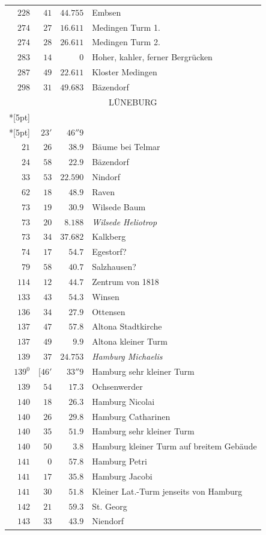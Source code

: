 \begin{longtable}{@{}rrrp{.61\linewidth}@{}}
\(228\)&\(41\)&\(44.755\)&\raggedright Embsen\tabularnewline
\(274\)&\(27\)&\(16.611\)&\raggedright Medingen Turm 1.\tabularnewline
\(274\)&\(28\)&\(26.611\)&\raggedright Medingen Turm 2.\tabularnewline
\(283\)&\(14\)&\(0\)&\raggedright Hoher, kahler, ferner Bergrücken\tabularnewline
\(287\)&\(49\)&\(22.611\)&\raggedright Kloster Medingen\tabularnewline
\(298\)&\(31\)&\(49.683\)&\raggedright Bäzendorf\tabularnewline
\multicolumn{4}{c}{\strut LÜNEBURG}\\*[5pt]
\multicolumn{4}{c}{Hauptplatz \(-191597.163\)\qquad\(-30574.951\)}\\*[5pt]
\multicolumn{3}{r}{\begin{tabular}{@{}rrr|@{}}\(21^{0}\)&\(23'\)&\(46''9\)\\
\(21\)&\(26\)&\(38.9\)\end{tabular}}&\raggedright Bäume bei Telmar\tabularnewline
\(24\)&\(58\)&\(22.9\)&\raggedright Bäzendorf\tabularnewline
\(33\)&\(53\)&\(22.590\)&\raggedright Nindorf\tabularnewline
\(62\)&\(18\)&\(48.9\)&\raggedright Raven\tabularnewline
\(73\)&\(19\)&\(30.9\)&\raggedright Wilsede Baum\tabularnewline
\(73\)&\(20\)&\(8.188\)&\raggedright \textit{Wilsede Heliotrop}\tabularnewline
\(73\)&\(34\)&\(37.682\)&\raggedright Kalkberg\tabularnewline
\(74\)&\(17\)&\(54.7\)&\raggedright Egestorf?\tabularnewline
\(79\)&\(58\)&\(40.7\)&\raggedright Salzhausen?\tabularnewline
\(114\)&\(12\)&\(44.7\)&\raggedright Zentrum von 1818\tabularnewline
\(133\)&\(43\)&\(54.3\)&\raggedright Winsen\tabularnewline
\(136\)&\(34\)&\(27.9\)&\raggedright Ottensen\tabularnewline
\(137\)&\(47\)&\(57.8\)&\raggedright Altona Stadtkirche\tabularnewline
\(137\)&\(49\)&\(9.9\)&\raggedright Altona kleiner Turm\tabularnewline
\(139\)&\(37\)&\(24.753\)&\raggedright \textit{Hamburg Michaelis}\tabularnewline
\(139^{0}\)&\([46'\)&\(33''9\)&\raggedright Hamburg sehr kleiner Turm\tabularnewline
\(139\)&\(54\)&\(17.3\)&\raggedright Ochsenwerder\tabularnewline
\(140\)&\(18\)&\(26.3\)&\raggedright Hamburg Nicolai\tabularnewline
\(140\)&\(26\)&\(29.8\)&\raggedright Hamburg Catharinen\tabularnewline
\(140\)&\(35\)&\(51.9\)&\raggedright Hamburg sehr kleiner Turm\tabularnewline
\(140\)&\(50\)&\(3.8\)&\raggedright Hamburg kleiner Turm auf breitem Gebäude\tabularnewline
\(141\)&\(0\)&\(57.8\)&\raggedright Hamburg Petri\tabularnewline
\(141\)&\(17\)&\(35.8\)&\raggedright Hamburg Jacobi\tabularnewline
\(141\)&\(30\)&\(51.8\)&\raggedright Kleiner Lat.-Turm jenseits von Hamburg\tabularnewline
\(142\)&\(21\)&\(59.3\)&\raggedright St. Georg\tabularnewline
\(143\)&\(33\)&\(43.9\)&\raggedright Niendorf\tabularnewline

\end{longtable}
